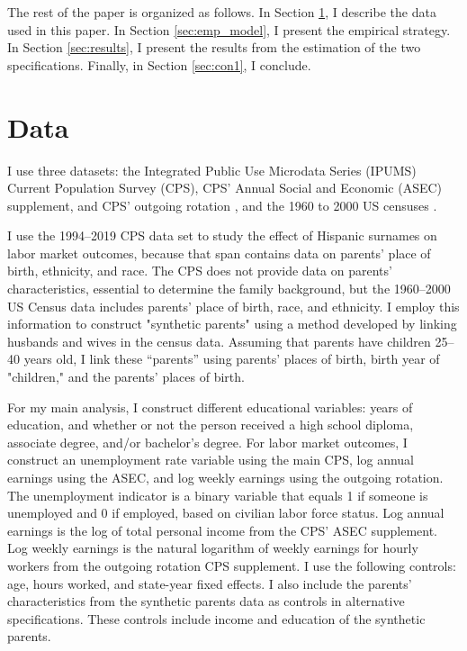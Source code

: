 The rest of the paper is organized as follows. In Section \ref{sec:data}, I describe the data used in this paper. In Section \ref{sec:emp_model}, I present the empirical strategy. In Section \ref{sec:results}, I present the results from the estimation of the two specifications. Finally, in Section \ref{sec:con1}, I conclude.

\section{Data}\label{sec:data}

I use three datasets:  the Integrated Public Use Microdata Series (IPUMS) Current Population Survey (CPS), CPS' Annual Social and Economic (ASEC) supplement, and CPS' outgoing rotation \autocite{cps2019}, and the 1960 to 2000 US censuses \autocite{acs2019}. 

I use the 1994–2019 CPS data set to study the effect of Hispanic surnames on labor market outcomes, because that span contains data on parents’ place of birth, ethnicity, and race. The CPS does not provide data on parents’ characteristics, essential to determine the family background, but the 1960–2000 US Census data includes parents’ place of birth, race, and ethnicity. I employ this information to construct "synthetic parents" using a method developed by \textcite{rubinstein2014pride} linking husbands and wives  in the census data. Assuming that parents have children 25–40 years old, I link these “parents” using parents’ places of birth, birth year of "children," and the parents’ places of birth.

For my main analysis, I construct different educational variables: years of education, and whether or not the person received a high school diploma, associate degree, and/or bachelor’s degree. For labor market outcomes, I construct an unemployment rate variable using the main CPS, log annual earnings using the ASEC, and log weekly earnings using the outgoing rotation. The unemployment indicator is a binary variable that equals 1 if someone is unemployed and 0 if employed, based on civilian labor force status. Log annual earnings is the log of total personal income from the CPS’ ASEC supplement. Log weekly earnings is the natural logarithm of weekly earnings for hourly workers from the outgoing rotation CPS supplement. I use the following controls: age, hours worked, and state-year fixed effects. I also include the parents’ characteristics from the synthetic parents data as controls in alternative specifications. These controls include income and education of the synthetic parents.

